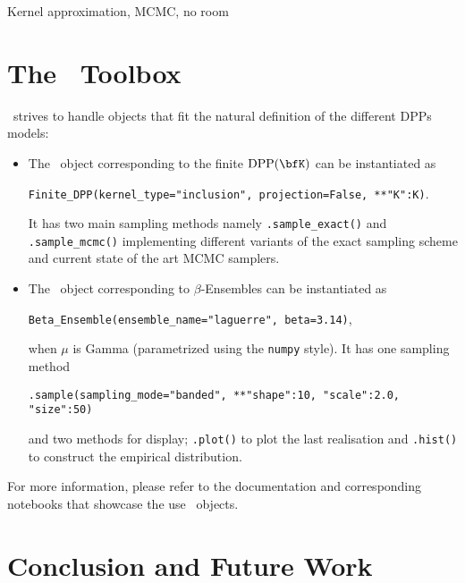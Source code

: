 \documentclass[twoside,11pt]{article}
\begin{document}
      Kernel approximation, MCMC, no room




\section{The \DPPy\ Toolbox} %
\label{sec:the_dppy_toolbox}

  \DPPy\ strives to handle objects that fit the natural definition of the different DPPs models:
  \begin{itemize}
	  \item The \DPPy\ object corresponding to the finite $\DPP(\bfK)$ can be instantiated as
	  \begin{nscenter}
	  	\texttt{Finite_DPP(kernel_type="inclusion", projection=False, **{"K":K})}.
	  \end{nscenter}
		It has two main sampling methods namely \texttt{.sample_exact()} and \texttt{.sample_mcmc()} implementing different variants of the exact sampling scheme and current state of the art MCMC samplers.

		\item The \DPPy\ object corresponding to $\beta$-Ensembles can be instantiated as
		\begin{nscenter}
			\texttt{Beta_Ensemble(ensemble_name="laguerre", beta=3.14)},
		\end{nscenter}
		when $\mu$ is Gamma (parametrized using the \texttt{numpy} style).
		It has one sampling method
		\begin{nscenter}
			\texttt{.sample(sampling_mode="banded", **{"shape":10, "scale":2.0, "size":50})}
		\end{nscenter}
		and two methods for display; \texttt{.plot()} to plot the last realisation and \texttt{.hist()} to construct the empirical distribution.

  \end{itemize}

  For more information, please refer to the documentation and corresponding notebooks that showcase the use \DPPy\ objects.




\section{Conclusion and Future Work} %
\label{sec:conclusion_and_future_work}
\end{document}
